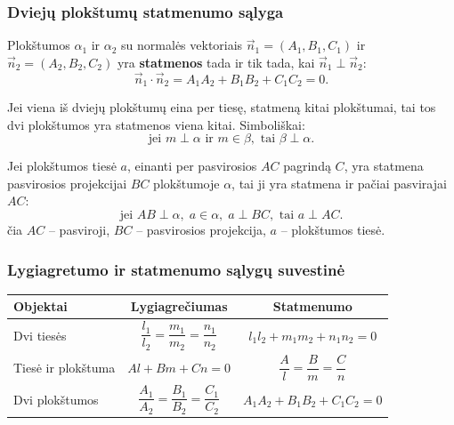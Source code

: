 \subsubsection*{Dviejų plokštumų statmenumo sąlyga}

\begin{theorem}
Plokštumos $\alpha_1$ ir $\alpha_2$ su normalės vektoriais
$\vec{n}_1 = (A_1, B_1, C_1)$ ir $\vec{n}_2 = (A_2, B_2, C_2)$
yra \textbf{statmenos} tada ir tik tada, kai $\vec{n}_1 \perp \vec{n}_2$:
\[
  \vec{n}_1 \cdot \vec{n}_2 = A_1 A_2 + B_1 B_2 + C_1 C_2 = 0.
\]
\end{theorem}

\begin{theorem}
Jei viena iš dviejų plokštumų eina per tiesę, statmeną kitai plokštumai,
tai tos dvi plokštumos yra statmenos viena kitai. Simboliškai:
\[
  \text{jei } m \perp \alpha \text{ ir } m \in \beta,
  \text{ tai } \beta \perp \alpha.
\]
\end{theorem}

\begin{theorem}
Jei plokštumos tiesė $a$, einanti per pasvirosios $AC$ pagrindą $C$, yra
statmena pasvirosios projekcijai $BC$ plokštumoje $\alpha$, tai ji yra
statmena ir pačiai pasvirajai $AC$:
\[
  \text{jei } AB \perp \alpha,\; a \in \alpha,\; a \perp BC,
  \text{ tai } a \perp AC.
\]
čia $AC$ -- pasviroji, $BC$ -- pasvirosios projekcija, $a$ -- plokštumos tiesė.
\end{theorem}

\subsubsection*{Lygiagretumo ir statmenumo sąlygų suvestinė}

\begin{center}
\begin{tabular}{|l|c|c|}
\hline
\textbf{Objektai} & \textbf{Lygiagrečiumas} & \textbf{Statmenumo} \\
\hline
Dvi tiesės
  & $\dfrac{l_1}{l_2} = \dfrac{m_1}{m_2} = \dfrac{n_1}{n_2}$
  & $l_1 l_2 + m_1 m_2 + n_1 n_2 = 0$ \\[8pt]
\hline
Tiesė ir plokštuma
  & $Al + Bm + Cn = 0$
  & $\dfrac{A}{l} = \dfrac{B}{m} = \dfrac{C}{n}$ \\[8pt]
\hline
Dvi plokštumos
  & $\dfrac{A_1}{A_2} = \dfrac{B_1}{B_2} = \dfrac{C_1}{C_2}$
  & $A_1 A_2 + B_1 B_2 + C_1 C_2 = 0$ \\[8pt]
\hline
\end{tabular}
\end{center}


